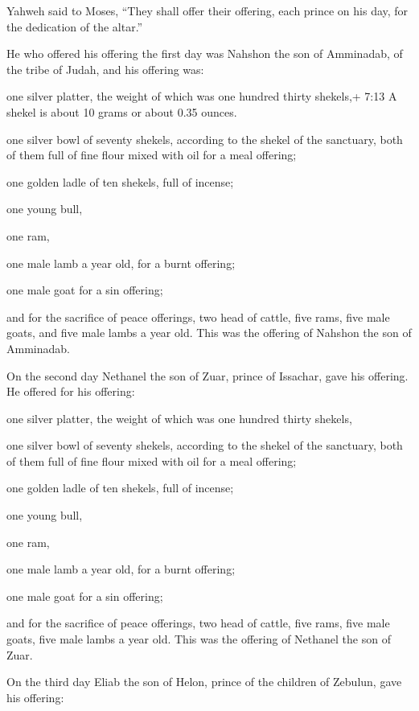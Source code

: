  Yahweh said to Moses, ``They shall offer their offering,
each prince on his day, for the dedication of the altar.''

 He who offered his offering the first day was Nahshon the
son of Amminadab, of the tribe of Judah,  and his offering
was:

one silver platter, the weight of which was one hundred thirty shekels,+
7:13 A shekel is about 10 grams or about 0.35 ounces.

one silver bowl of seventy shekels, according to the shekel of the
sanctuary, both of them full of fine flour mixed with oil for a meal
offering;

 one golden ladle of ten shekels, full of incense;

 one young bull,

one ram,

one male lamb a year old, for a burnt offering;

 one male goat for a sin offering;

 and for the sacrifice of peace offerings, two head of
cattle, five rams, five male goats, and five male lambs a year old. This
was the offering of Nahshon the son of Amminadab.

 On the second day Nethanel the son of Zuar, prince of
Issachar, gave his offering.  He offered for his offering:

one silver platter, the weight of which was one hundred thirty shekels,

one silver bowl of seventy shekels, according to the shekel of the
sanctuary, both of them full of fine flour mixed with oil for a meal
offering;

 one golden ladle of ten shekels, full of incense;

 one young bull,

one ram,

one male lamb a year old, for a burnt offering;

 one male goat for a sin offering;

 and for the sacrifice of peace offerings, two head of
cattle, five rams, five male goats, five male lambs a year old. This was
the offering of Nethanel the son of Zuar.

 On the third day Eliab the son of Helon, prince of the
children of Zebulun,  gave his offering:

